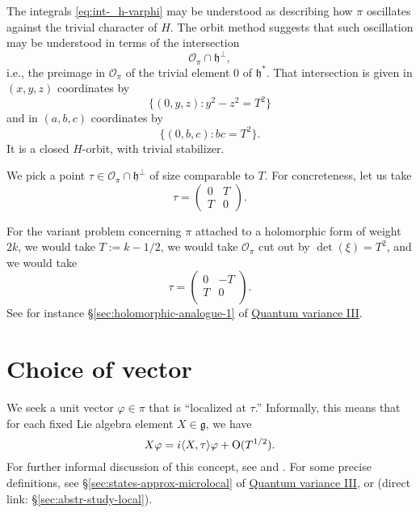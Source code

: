 \documentclass[reqno]{amsart} 
\numberwithin{equation}{section}
\begin{document}
The integrals \eqref{eq:int-_h-varphi} may be understood as describing how $\pi$ oscillates against the trivial character of $H$.  The orbit method suggests \cite[\S1.9]{nelson-venkatesh-1} that such oscillation may be understood in terms of the intersection
\begin{equation*}
  \mathcal{O}_\pi \cap \mathfrak{h}^\perp,
\end{equation*}
i.e., the preimage in $\mathcal{O}_\pi$ of the trivial element $0$ of $\mathfrak{h}^*$.  That intersection is given in $(x,y,z)$ coordinates by
\begin{equation*}
  \{(0,y,z) : y^2 - z^2 = T^2\}
\end{equation*}
and in $(a,b,c)$ coordinates by
\begin{equation*}
  \{(0,b,c) : b c = T^2\}.
\end{equation*}
It is a closed $H$-orbit, with trivial stabilizer.

We pick a point $\tau \in \mathcal{O}_\pi \cap \mathfrak{h}^\perp$ of size comparable to $T$.  For concreteness, let us take
\begin{equation*}
  \tau = \begin{pmatrix}
    0 & T \\
    T & 0
  \end{pmatrix}.
\end{equation*}

\begin{remark}
  For the variant problem concerning $\pi$ attached to a holomorphic form of weight $2 k$, we would take $T := k - 1/2$, we would take $\mathcal{O}_\pi$ cut out by $\det(\xi) = T^2$, and we would take
  \begin{equation*}
\tau =
\begin{pmatrix}
0 & -T \\
T & 0 \\
\end{pmatrix}.
\end{equation*}
See for instance \S\ref{sec:holomorphic-analogue-1} of \href{var-quat-3-submitted.pdf}{Quantum variance III}.
\end{remark}


\section{Choice of vector}\label{sec:org806411a}
We seek a unit vector $\varphi \in \pi$ that is ``localized at $\tau$.''  Informally, this means that for each fixed Lie algebra element $X \in \mathfrak{g}$, we have
\begin{equation}\label{eq:x-varphi-=}
  X \varphi = {i \langle X, \tau  \rangle} \varphi + \operatorname{O}(T^{1/2}).
\end{equation}
For further informal discussion of this concept, see \cite[\S1.7]{nelson-venkatesh-1} and \cite[\S2.5]{2020arXiv201202187N} .  For some precise definitions, see \S\ref{sec:states-approx-microlocal} of \href{var-quat-3-submitted.pdf}{Quantum variance III}, or \cite[\S14]{2021arXiv210915230N} (direct link: \S\ref{sec:abstr-study-local}).
\end{document}
